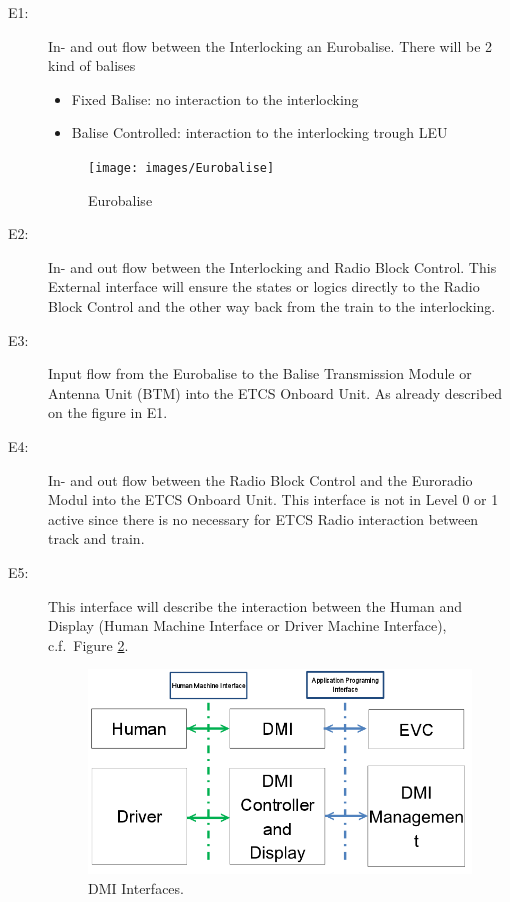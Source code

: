 \begin{description}
\item[E1:] In- and out flow between the Interlocking an Eurobalise. There will be 2 kind of balises
\begin{itemize}
\item Fixed Balise: no interaction to the interlocking
\item Balise Controlled: interaction to the interlocking trough LEU
\end{itemize}
\begin{figure}
\centering
\texttt{[image: images/Eurobalise]}
\caption{Eurobalise}
\label{Eurobalise}
\end{figure}

\item[E2:] In- and out flow between the Interlocking and Radio Block Control.
This External interface will ensure the states or logics directly to the Radio Block Control and the other way back from the train to the interlocking.

\item[E3:] Input flow from the Eurobalise to the Balise Transmission Module or Antenna Unit (BTM) into the ETCS Onboard Unit. As already described on the figure in E1.

\item[E4:] In- and out flow between the Radio Block Control and the Euroradio Modul into the ETCS Onboard Unit. This interface is not in Level 0 or 1 active since there is no necessary for ETCS Radio interaction between track and train.

\item[E5:] This interface will describe the interaction between the Human and Display (Human Machine Interface or Driver Machine Interface), c.f.~Figure \ref{DMI Interfaces}.
\begin{figure}
\centering
\includegraphics[scale=0.6]{images/DMIinterfaces}
\caption{DMI Interfaces.}
\label{DMI Interfaces}
\end{figure}


\end{description}
